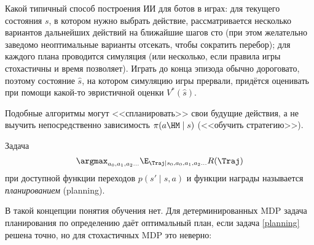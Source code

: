 \begin{example}
Какой типичный способ построения ИИ для ботов в играх: для текущего состояния $s$, в котором нужно выбрать действие, рассматривается несколько вариантов дальнейших действий на ближайшие шагов сто (при этом желательно заведомо неоптимальные варианты отсекать, чтобы сократить перебор); для каждого плана проводится симуляция (или несколько, если правила игры стохастичны и время позволяет). Играть до конца эпизода обычно дороговато, поэтому состояние $\hat{s}$, на котором симуляцию игры прервали, придётся оценивать при помощи какой-то эвристичной оценки $V^*(\hat{s})$.
\end{example}

Подобные алгоритмы могут <<спланировать>> свои будущие действия, а не выучить непосредственно зависимость $\pi(a \HM\mid s)$ (<<обучить стратегию>>).

\begin{definition}
Задача
\begin{equation}\label{planning}
\argmax_{a_0, a_1, a_2 \dots} \E_{\Traj \mid s_0, a_0, a_1, a_2 \dots} R(\Traj)
\end{equation}
при доступной функции переходов $p(s' \mid s, a)$ и функции награды называется \emph{планированием} (planning).
\end{definition}

В такой концепции понятия обучения нет. Для детерминированных MDP задача планирования по определению даёт оптимальный план, если задача \eqref{planning} решена точно, но для стохастичных MDP это неверно: 

